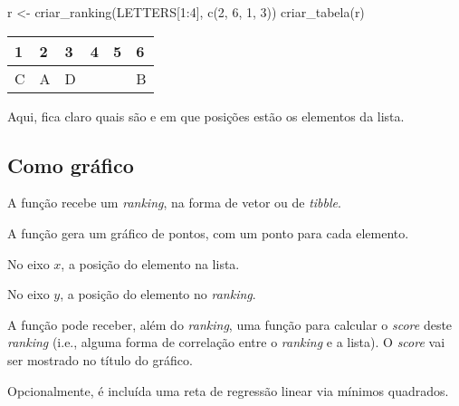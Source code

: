 \documentclass[
  letterpaper,
  DIV=11,
  numbers=noendperiod]{scrreprt}
\newenvironment{Shaded}{\begin{snugshade}}{\end{snugshade}}
\newcommand{\DecValTok}[1]{\textcolor[rgb]{0.68,0.00,0.00}{#1}}
\newcommand{\FunctionTok}[1]{\textcolor[rgb]{0.28,0.35,0.67}{#1}}
\newcommand{\NormalTok}[1]{\textcolor[rgb]{0.00,0.23,0.31}{#1}}
\newcommand{\OtherTok}[1]{\textcolor[rgb]{0.00,0.23,0.31}{#1}}
\newcommand{\SpecialCharTok}[1]{\textcolor[rgb]{0.37,0.37,0.37}{#1}}
\begin{document}
\begin{Shaded}
\begin{Highlighting}[]
\NormalTok{r }\OtherTok{\textless{}{-}} \FunctionTok{criar\_ranking}\NormalTok{(LETTERS[}\DecValTok{1}\SpecialCharTok{:}\DecValTok{4}\NormalTok{], }\FunctionTok{c}\NormalTok{(}\DecValTok{2}\NormalTok{, }\DecValTok{6}\NormalTok{, }\DecValTok{1}\NormalTok{, }\DecValTok{3}\NormalTok{))}
\FunctionTok{criar\_tabela}\NormalTok{(r)}
\end{Highlighting}
\end{Shaded}

\begin{longtable*}{llllll}
 & 2 & 3 & 4 & 5 & 6 \\ 
\midrule\addlinespace[2.5pt]
C & A & D &  &  & B \\ 
\bottomrule
\end{longtable*}

Aqui, fica claro quais são e em que posições estão os elementos da
lista.

\subsection{Como gráfico}\label{como-gruxe1fico}

A função recebe um \emph{ranking}, na forma de vetor ou de
\emph{tibble}.

A função gera um gráfico de pontos, com um ponto para cada elemento.

No eixo $x$, a posição do elemento na lista.

No eixo $y$, a posição do elemento no \emph{ranking}.

A função pode receber, além do \emph{ranking}, uma função para calcular
o \emph{score} deste \emph{ranking} (i.e., alguma forma de correlação
entre o \emph{ranking} e a lista). O \emph{score} vai ser mostrado no
título do gráfico.

Opcionalmente, é incluída uma reta de regressão linear via mínimos
quadrados.
\end{document}
